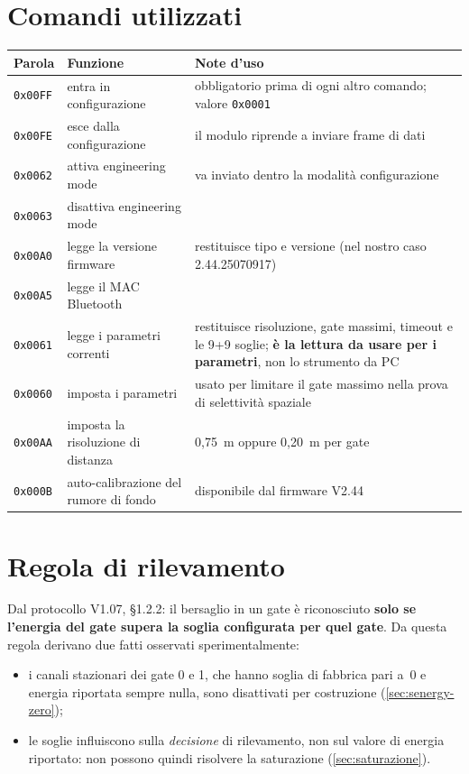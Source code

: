 \section{Comandi utilizzati}

\begin{center}\small
\begin{tabularx}{\linewidth}{@{}llX@{}}
\toprule
\textbf{Parola} & \textbf{Funzione} & \textbf{Note d'uso} \\
\midrule
\texttt{0x00FF} & entra in configurazione & obbligatorio prima di ogni altro
  comando; valore \texttt{0x0001} \\
\texttt{0x00FE} & esce dalla configurazione & il modulo riprende a inviare frame di
  dati \\
\texttt{0x0062} & attiva engineering mode & va inviato dentro la modalità
  configurazione \\
\texttt{0x0063} & disattiva engineering mode & \\
\texttt{0x00A0} & legge la versione firmware & restituisce tipo e versione
  (nel nostro caso 2.44.25070917) \\
\texttt{0x00A5} & legge il MAC Bluetooth & \\
\texttt{0x0061} & legge i parametri correnti & restituisce risoluzione, gate massimi,
  timeout e le 9+9 soglie; \textbf{è la lettura da usare per i parametri}, non lo
  strumento da PC \\
\texttt{0x0060} & imposta i parametri & usato per limitare il gate massimo nella prova
  di selettività spaziale \\
\texttt{0x00AA} & imposta la risoluzione di distanza & 0,75~m oppure 0,20~m per gate \\
\texttt{0x000B} & auto-calibrazione del rumore di fondo & disponibile dal firmware
  V2.44~\cite{hilinkV244} \\
\bottomrule
\end{tabularx}
\end{center}

\section{Regola di rilevamento}

Dal protocollo V1.07, \S1.2.2: il bersaglio in un gate è riconosciuto
\textbf{solo se l'energia del gate supera la soglia configurata per quel gate}. Da
questa regola derivano due fatti osservati sperimentalmente:

\begin{itemize}[leftmargin=1.4em,itemsep=2pt]
  \item i canali stazionari dei gate 0 e 1, che hanno soglia di fabbrica pari a~0 e
        energia riportata sempre nulla, sono disattivati per costruzione
        (\cref{sec:senergy-zero});
  \item le soglie influiscono sulla \emph{decisione} di rilevamento, non sul valore
        di energia riportato: non possono quindi risolvere la saturazione
        (\cref{sec:saturazione}).
\end{itemize}

